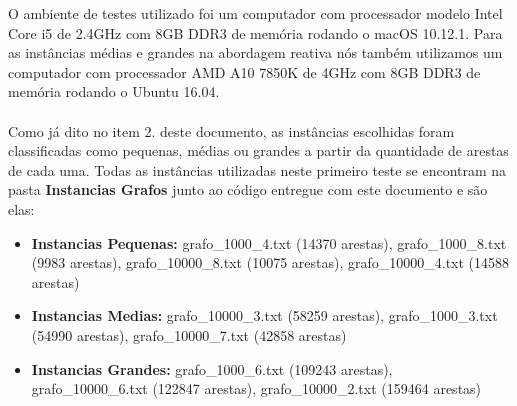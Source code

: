 \documentclass[a4paper, 12pt]{article}
\begin{document}
O ambiente de testes utilizado foi um computador com processador modelo Intel Core i5 de 2.4GHz com 8GB DDR3 de memória rodando o macOS 10.12.1. Para as instâncias médias e grandes na abordagem reativa nós também utilizamos um computador
com processador AMD A10 7850K de 4GHz com 8GB DDR3 de memória rodando o Ubuntu 16.04.
\\ \\ \indent Como já dito no item 2. deste documento, as instâncias escolhidas foram classificadas como pequenas, médias ou grandes
a partir da quantidade de arestas de cada uma. Todas as instâncias utilizadas neste primeiro teste se encontram na pasta \textbf{Instancias Grafos} junto ao código entregue com este documento e são elas:

\begin{itemize}
  \item \textbf{Instancias Pequenas:} grafo\_1000\_4.txt (14370 arestas), grafo\_1000\_8.txt (9983 arestas), grafo\_10000\_8.txt (10075 arestas), grafo\_10000\_4.txt (14588 arestas)
  \item \textbf{Instancias Medias:} grafo\_10000\_3.txt (58259 arestas), grafo\_1000\_3.txt (54990 arestas), grafo\_10000\_7.txt (42858 arestas)
  \item \textbf{Instancias Grandes:} grafo\_1000\_6.txt (109243 arestas), grafo\_10000\_6.txt (122847 arestas), grafo\_10000\_2.txt (159464 arestas)
\end{itemize}
\end{document}
